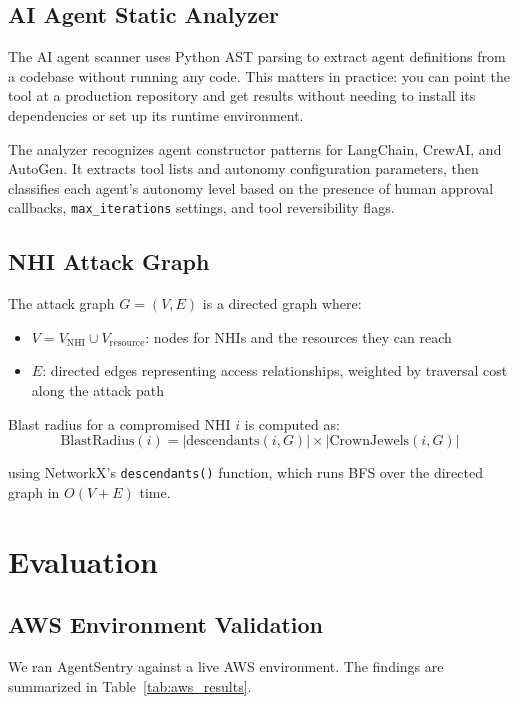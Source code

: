 \documentclass[conference]{IEEEtran}
\begin{document}
\subsection{AI Agent Static Analyzer}

The AI agent scanner uses Python AST parsing to extract agent definitions from
a codebase without running any code. This matters in practice: you can point
the tool at a production repository and get results without needing to install
its dependencies or set up its runtime environment.

The analyzer recognizes agent constructor patterns for LangChain, CrewAI, and
AutoGen. It extracts tool lists and autonomy configuration parameters, then
classifies each agent's autonomy level based on the presence of human approval
callbacks, \texttt{max\_iterations} settings, and tool reversibility flags.

\subsection{NHI Attack Graph}

The attack graph $G = (V, E)$ is a directed graph where:
\begin{itemize}
  \item $V = V_{\text{NHI}} \cup V_{\text{resource}}$: nodes for NHIs and
        the resources they can reach
  \item $E$: directed edges representing access relationships, weighted by
        traversal cost along the attack path
\end{itemize}

Blast radius for a compromised NHI $i$ is computed as:
\begin{equation}
  \text{BlastRadius}(i) = |\text{descendants}(i, G)| \times
  |\text{CrownJewels}(i, G)|
  \label{eq:blast}
\end{equation}

using NetworkX's \texttt{descendants()} function, which runs BFS over the
directed graph in $O(V + E)$ time.

\section{Evaluation}

\subsection{AWS Environment Validation}

We ran AgentSentry against a live AWS environment. The findings are summarized
in Table~\ref{tab:aws_results}.
\end{document}
